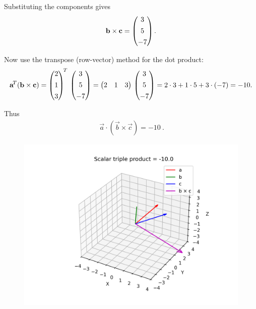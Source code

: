 \documentclass[12pt]{article}
\begin{document}
Substituting the components gives
\begin{align}
\mathbf b\times\mathbf c = \begin{pmatrix}3\\[4pt]5\\[4pt]-7\end{pmatrix}.
\end{align}

Now use the transpose (row-vector) method for the dot product:
\begin{align}
\mathbf a^{\!T}(\mathbf b\times\mathbf c)
= \begin{pmatrix}2\\[4pt]1\\[4pt]3\end{pmatrix}^{\!T}\,\begin{pmatrix}3\\[4pt]5\\[4pt]-7\end{pmatrix}
= \begin{pmatrix}2 & 1 & 3\end{pmatrix}\,\begin{pmatrix}3\\[4pt]5\\[4pt]-7\end{pmatrix}
= 2\cdot 3 + 1\cdot 5 + 3\cdot(-7) = -10.
\end{align}

Thus
\begin{align}
\boxed{\ \vec a\cdot(\vec b\times\vec c) = -10\ }.
\end{align}

\begin{figure}[H]
    \centering
    \includegraphics[width=0.9\columnwidth]{figs/triple_product.png}
    \caption{}
    \label{fig:placeholder}
\end{figure}
\end{document}

